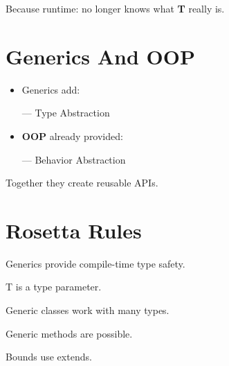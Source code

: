 \documentclass[11pt,a4paper]{book}
\begin{document}
Because \textcolor{RosettaPurple}{runtime}: no longer knows
what \textcolor{RosettaDeepGreen}{\textbf{T}} really is.

\section{Generics And OOP}
\begin{itemize}
\item []\textcolor{RosettaJade}{Generics} add:

    --- Type Abstraction

\item []\textcolor{RosettaRoyalPurple}{\textbf{OOP}} already provided:

    --- Behavior Abstraction
\end{itemize}

    Together they create reusable APIs.

\section{Rosetta Rules}

\begin{rosettarule}

Generics provide compile-time type safety.

\end{rosettarule}

\begin{rosettarule}

T is a type parameter.

\end{rosettarule}

\begin{rosettarule}

Generic classes work with many types.

\end{rosettarule}

\begin{rosettarule}

Generic methods are possible.

\end{rosettarule}

\begin{rosettarule}

Bounds use extends.

\end{rosettarule}
\end{document}
